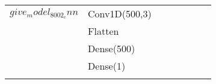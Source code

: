 \begin{longtable}{| c | m{0.58\linewidth} | r | m{0.1\linewidth} |}
    $give_model_8002_cnn$          & Conv1D(500,3)             \\
                                   & Flatten                   \\
                                   & Dense(500)                \\
                                   & Dense(1)                  \\ \hline





                                   




    \label{table:sieci}
\end{longtable}